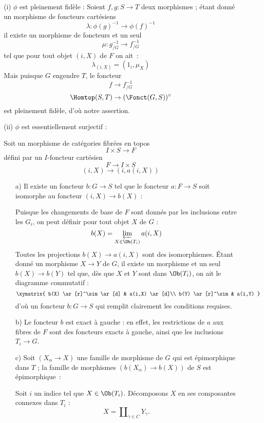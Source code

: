 \begin{enumerate}
    \item[(i)] $\phi$ est pleinement fidèle : 
    Soient $f, g: S \to T$ deux morphismes ; étant donné un morphisme de foncteurs cartésiens
    $$
    \lambda: \phi(g)^{-1} \to \phi(f)^{-1}
    $$
    il existe un morphisme de foncteurs et un seul
    $$
    \mu: g^{-1}_{/G} \to f^{-1}_{/G}
    $$
    tel que pour tout objet $(i, X)$ de $F$ on ait~: 
    $$
    \lambda_{(i, X)} = (1_i, \mu_X)
    $$
    Mais puisque $G$ engendre $T$, le foncteur
    $$
    f \to f^{-1}_{/G}
    $$
    $$
    \Homtop(S, T) \to (\Fonct(G, S))^\circ
    $$
    est pleinement fidèle, d'où notre assertion.
    \item[(ii)] $\phi$ est essentiellement surjectif : 
    
    Soit un morphisme de catégories fibrées en topos
    $$
    I \times S \to F
    $$
    défini par un $I$-foncteur cartésien
    $$
    F \to I \times S
    $$
    $$
    (i, X) \to (i, a(i, X))
    $$
    \begin{enumerate}
        \item[a)] Il existe un foncteur $b: G \to S$ tel que le foncteur $a: F \to S$ soit isomorphe au foncteur $(i, X) \to b(X)$ :
        
        Puisque les changements de base de $F$ sont donnés par les inclusions entre les $G_i$, on peut définir pour tout objet $X$ de $G$ :
        $$
        b(X) = \varprojlim_{X \in \Ob(T_i)} a(i, X)
        $$
    Toutes les projections $b(X) \to a(i, X)$ sont des isomorphismes. Étant donné un morphisme $X \to Y$ de $G$, il existe un morphisme et un seul $b(X) \to b(Y)$ tel que, dès que $X$ et $Y$ sont dans $\Ob(T_i)$, on ait le diagramme commutatif :
    $$
        \xymatrix{
            b(X) \ar[r]^\sim \ar[d] & a(i,X) \ar[d]\\
            b(Y) \ar[r]^\sim & a(i,Y)
        }
    $$
     d'où un foncteur $b: G\to S$ qui remplit clairement les conditions requises.
     \item[b)] Le foncteur $b$ est exact à gauche : en effet, les restrictions de $a$ aux fibres de $F$ sont des foncteurs exacts à gauche, ainsi que les inclusions $T_i \to G$.
     \item[c)] Soit $(X_\alpha \to X)$ une famille de morphisme de $G$ qui est épimorphique dans $T$ ; la famille de morphismes $(b(X_\alpha) \to b(X))$ de $S$ est épimorphique~:
     
     Soit $i$ un indice tel que $X \in \Ob(T_i)$. Décomposons $X$ en ses composantes connexes dans $T_i$ :
     $$
     X = \amalg_{\gamma \in C} Y_\gamma .
     $$



\end{enumerate}
\end{enumerate}
